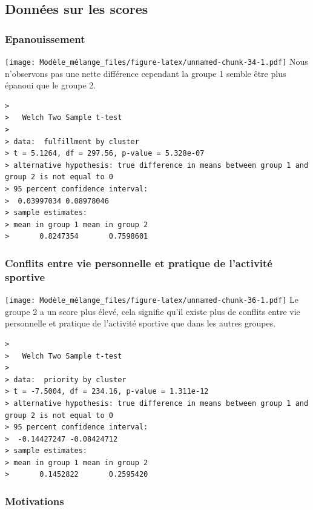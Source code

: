 \documentclass[
]{article}
\begin{document}
\hypertarget{donnuxe9es-sur-les-scores}{%
\subsection{Données sur les scores}\label{donnuxe9es-sur-les-scores}}

\hypertarget{epanouissement}{%
\subsubsection{Epanouissement}\label{epanouissement}}

\texttt{[image: Modèle\_mélange\_files/figure-latex/unnamed-chunk-34-1.pdf]}
Nous n'observons pas une nette différence cependant la groupe 1 semble
être plus épanoui que le groupe 2.

\begin{verbatim}
> 
>   Welch Two Sample t-test
> 
> data:  fulfillment by cluster
> t = 5.1264, df = 297.56, p-value = 5.328e-07
> alternative hypothesis: true difference in means between group 1 and group 2 is not equal to 0
> 95 percent confidence interval:
>  0.03997034 0.08978046
> sample estimates:
> mean in group 1 mean in group 2 
>       0.8247354       0.7598601
\end{verbatim}

\hypertarget{conflits-entre-vie-personnelle-et-pratique-de-lactivituxe9-sportive}{%
\subsubsection{Conflits entre vie personnelle et pratique de l'activité
sportive}\label{conflits-entre-vie-personnelle-et-pratique-de-lactivituxe9-sportive}}

\texttt{[image: Modèle\_mélange\_files/figure-latex/unnamed-chunk-36-1.pdf]}
Le groupe 2 a un score plus élevé, cela signifie qu'il existe plus de
conflits entre vie personnelle et pratique de l'activité sportive que
dans les autres groupes.

\begin{verbatim}
> 
>   Welch Two Sample t-test
> 
> data:  priority by cluster
> t = -7.5004, df = 234.16, p-value = 1.311e-12
> alternative hypothesis: true difference in means between group 1 and group 2 is not equal to 0
> 95 percent confidence interval:
>  -0.14427247 -0.08424712
> sample estimates:
> mean in group 1 mean in group 2 
>       0.1452822       0.2595420
\end{verbatim}

\hypertarget{motivations}{%
\subsubsection{Motivations}\label{motivations}}
\end{document}
